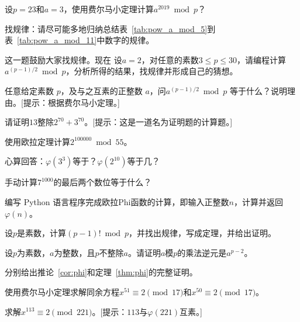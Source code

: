 \begin{problemset}

  \item 设$p = 23$和$a = 3$，使用费尔马小定理计算$a^{2019} \bmod p$？ %

  \item 找规律：请尽可能多地归纳总结表~\ref{tab:pow_a_mod_5}到表~\ref{tab:pow_a_mod_11}中数字的规律。

  \item 这一题鼓励大家找规律。现在
  设$a = 2$，对任意的素数$3 \leq p \leq 30$，请编程计算$a^{(p-1)/2} \bmod p$，分析所得的结果，找规律并形成自己的猜想。

  \item 任意给定素数 $p$，及与之互素的正整数 $a$，问$a^{(p-1)/2} \bmod p$ 等于什么？说明理由。[提示：根据费尔马小定理。]

  \item 请证明$13$整除$2^{70} + 3^{70}$。[提示：这是一道名为证明题的计算题。]%

  \item 使用欧拉定理计算$2^{100000} \bmod 55$。%

  \item 心算回答：$\varphi(3^3)$等于？$\varphi(2^{10})$等于几？%

  \item 手动计算$7^{1000}$的最后两个数位等于什么？%

  \item 编写 Python 语言程序完成欧拉Phi函数的计算，即输入正整数$n$，计算并返回$\varphi(n)$。

  \item 设$p$是素数，计算$(p-1)! \bmod p$，并找出规律，写成定理，并给出证明。

  \item 设$p$为素数，$a$为整数，且$p$不整除$a$。请证明$a$模$p$的乘法逆元是$a^{p-2}$。

  \item 分别给出推论~\ref{cor:phi}和定理~\ref{thm:phi}的完整证明。

  \item 使用费尔马小定理求解同余方程$x^{51} \equiv 2 \pmod{17}$和$x^{50} \equiv 2 \pmod{17}$。%

  \item 求解$x^{113} \equiv 2 \pmod{221}$。[提示：$113$与$\varphi(221)$互素。]


\end{problemset}
